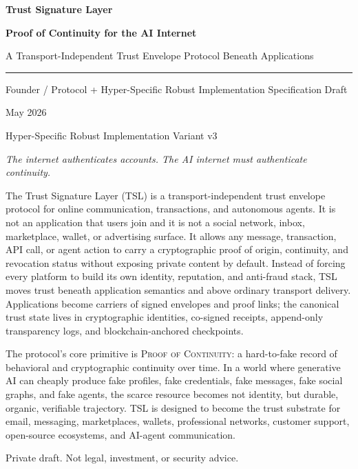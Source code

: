 \documentclass[11pt]{article}
\newcommand{\TSL}{\textsc{TSL}}
\newcommand{\PoC}{\textsc{Proof of Continuity}}
\begin{document}
\begin{titlepage}
\thispagestyle{empty}
\centering
\vspace*{1.2cm}
{\Huge\bfseries Trust Signature Layer\par}
\vspace{0.35cm}
{\LARGE\bfseries Proof of Continuity for the AI Internet\par}
\vspace{0.45cm}
{\large A Transport-Independent Trust Envelope Protocol Beneath Applications\par}
\vspace{0.85cm}
\rule{0.72\textwidth}{0.6pt}\par
\vspace{0.85cm}
{\large Founder / Protocol + Hyper-Specific Robust Implementation Specification Draft\par}
\vspace{0.2cm}
{\large May 2026\par}
{\large Hyper-Specific Robust Implementation Variant v3\par}
\vspace{1.1cm}
\begin{minipage}{0.82\textwidth}
\centering
\large\itshape
The internet authenticates accounts. The AI internet must authenticate continuity.
\end{minipage}
\vspace{1.0cm}

\begin{tcolorbox}[
    colback=blue!3,
    colframe=tslblue,
    boxrule=0.7pt,
    arc=2mm,
    width=0.88\textwidth,
    title=Executive Abstract
]
The Trust Signature Layer (\TSL) is a transport-independent trust envelope protocol for online communication, transactions, and autonomous agents. It is not an application that users join and it is not a social network, inbox, marketplace, wallet, or advertising surface. It allows any message, transaction, API call, or agent action to carry a cryptographic proof of origin, continuity, and revocation status without exposing private content by default. Instead of forcing every platform to build its own identity, reputation, and anti-fraud stack, \TSL{} moves trust beneath application semantics and above ordinary transport delivery. Applications become carriers of signed envelopes and proof links; the canonical trust state lives in cryptographic identities, co-signed receipts, append-only transparency logs, and blockchain-anchored checkpoints.

The protocol's core primitive is \PoC: a hard-to-fake record of behavioral and cryptographic continuity over time. In a world where generative AI can cheaply produce fake profiles, fake credentials, fake messages, fake social graphs, and fake agents, the scarce resource becomes not identity, but durable, organic, verifiable trajectory. \TSL{} is designed to become the trust substrate for email, messaging, marketplaces, wallets, professional networks, customer support, open-source ecosystems, and AI-agent communication.
\end{tcolorbox}

\vfill
{\small Private draft. Not legal, investment, or security advice.}
\end{titlepage}
\end{document}
